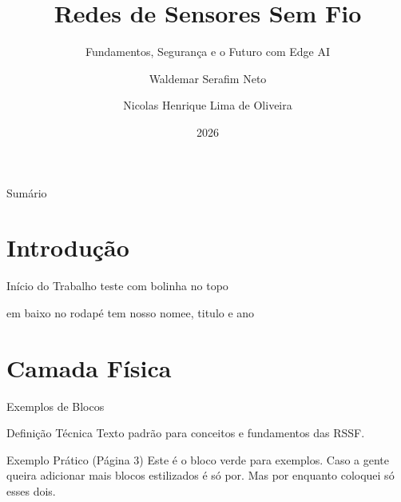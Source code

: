 \documentclass[10pt, aspectratio=169]{beamer}
\title[Redes de Sensores Sem Fio]{Redes de Sensores Sem Fio}
\subtitle{Fundamentos, Segurança e o Futuro com Edge AI}
\author[Serafim \& Oliveira]{Waldemar Serafim Neto \and Nicolas Henrique Lima de Oliveira}
\institute[UEL]{Universidade Estadual de Londrina}
\date{2026}
\begin{document}
\begin{frame}
\end{frame}

\begin{frame}{Sumário}
    \tableofcontents
\end{frame}














\section{Introdução} %
\begin{frame}{Início do Trabalho}
    teste com bolinha no topo
    
    em baixo no rodapé tem nosso nomee, titulo e ano
\end{frame}

\section{Camada Física} 
\begin{frame}{Exemplos de Blocos}
    \begin{block}{Definição Técnica}
        Texto padrão para conceitos e fundamentos das RSSF.
    \end{block}

    \begin{exampleblock}{Exemplo Prático (Página 3)}
        Este é o bloco verde para exemplos. Caso a gente queira adicionar mais blocos estilizados é só por. Mas por enquanto coloquei só esses dois.
    \end{exampleblock}
\end{frame}
\end{document}
